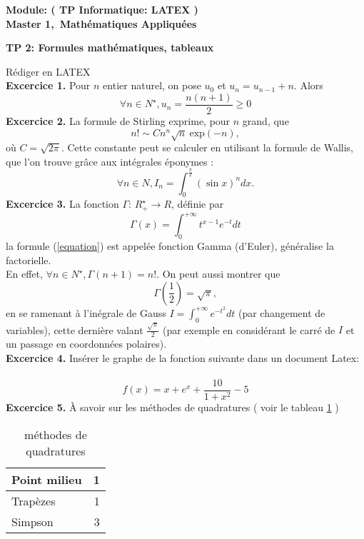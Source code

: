 
%
%
%
\pagestyle{myheadings} \markboth{}{}

\def\dfrac{\displaystyle\frac}
\def\dint{\displaystyle\int}
\def\dsum{\displaystyle\sum}
\def\text{\hbox}
\def\iint{\int\!\!\int}

\noindent
\bf  {Module: ( TP Informatique: LATEX  )\qquad{}}\\
\bf {Master 1,\ Math\'ematiques Appliqu\'ees}\\
\begin{center}
\bf {TP 2: Formules math\'ematiques, tableaux}
\end{center}
R\'ediger en \large {LATEX}\\
\noindent
\small {\bf Excercice 1.}
Pour $n$ entier naturel, on pose $u_{0}$ et $u_{n}=u_{n-1}+n$. Alors\\
\begin{equation}
\forall n\in {N}^{\star} , u_n=\frac{n(n+1)}{2}\geq 0
\end{equation}
\noindent
\small {\bf Excercice 2.}
La formule de Stirling exprime,  pour $n$ grand, que
$$
n! \sim Cn^n\sqrt{n} \ \textrm{exp}(-n),
$$
o\`u $C=\sqrt{2\pi}$. Cette constante peut se calculer en utilisant la formule de Wallis,
que l'on trouve gr\^ace aux int\'egrales \'eponymes :
$$
\forall n\in N, I_n=\int_{0}^{\frac{\pi}{2}}(\sin x)^n dx.
$$
\noindent
\small {\bf Excercice 3.}
La fonction $\Gamma$: $R_{+}^{\star}\rightarrow R$, d\'efinie par
\begin{equation} \label{equation}
\Gamma(x)=\int_{0}^{+\infty}t^{x-1}e^{-t}dt
\end{equation}
la formule (\ref{equation}) est appel\'ee fonction Gamma (d'Euler), g\'en\'eralise la factorielle.\\
En effet, $\forall n \in N^{\star}, \Gamma(n+1)=n! $. On peut aussi montrer que
$$
\Gamma\left(\frac{1}{2}\right)=\sqrt{\pi},
$$
en se ramenant \`a l'in\'egrale de Gauss $I=\int_{0}^{+\infty}e^{-t^2}dt$
(par changement de variables), cette derni\`ere valant
$\frac{\sqrt{\pi}}{2}$ (par exemple en consid\'erant le carr\'e de $I$ et un passage en coordonn\'ees polaires).\\
\small {\bf Excercice 4.}
Ins\'erer le graphe de la fonction suivante dans un document Latex: \ \
$$
f(x)=x+e^x+\frac{10}{1+x^2}-5
$$
\noindent
\small {\bf Excercice 5.}
\`{A} savoir sur les m\'ethodes de quadratures ( voir le tableau \ref{tabm} )

\begin{table}
\begin{center}
\begin{tabular}{|l|r|}
\hline
Point milieu        &   1     \\
\hline
Trap\`ezes    &   1          \\
\hline
Simpson     &    3\\
\hline
\end{tabular}
\caption { m\'ethodes de quadratures \label{tabm}}
\end{center}
\end{table}


